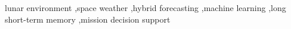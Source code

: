 lunar environment \sep space weather \sep hybrid forecasting \sep machine learning \sep long short-term memory \sep mission decision support
